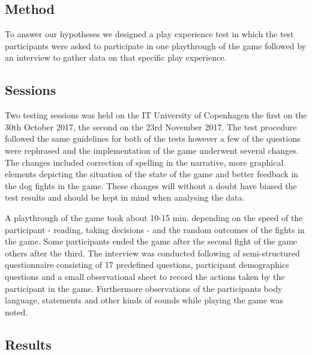 \subsection{Method}
To answer our hypotheses we designed a play experience test in which the test participants were asked to participate in one playthrough of the game followed by an interview to gather data on that specific play experience.

\subsection{Sessions}
Two testing sessions was held on the IT University of Copenhagen the first on the 30th October 2017, the second on the 23rd November 2017. The test procedure followed the same guidelines for both of the tests however a few of the questions were rephrased and the implementation of the game underwent several changes. The changes included correction of spelling in the narrative, more graphical elements depicting the situation of the state of the game and better feedback in the dog fights in the game. These changes will without a doubt have biased the test results and should be kept in mind when analysing the data.



A playthrough of the game took about 10-15 min. depending on the speed of the participant - reading, taking decisions - and the random outcomes of the fights in the game. Some participants ended the game after the second fight of the game others after the third.  
The interview was conducted following af semi-structured questionnaire consisting of 17 predefined questions, participant demographics questions and a small observational sheet to record the actions taken by the participant in the game. Furthermore observations of the participants body language, statements and other kinds of sounds while playing the game was noted.

\subsection{Results}
